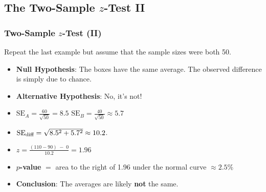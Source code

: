 \documentclass[t]{beamer}
\begin{document}
\subsection{The Two-Sample $z$-Test II}
\begin{frame}
\frametitle{Two-Sample $z$-Test (II)}

{Repeat the last example but assume that the sample sizes were both 50.

\begin{itemize}
\item \textbf{\color{blue}Null Hypothesis}:  The boxes have the same average.  
   The observed difference is simply due to chance.
\item \textbf{\color{blue}Alternative Hypothesis}: No, it's not!\vspace{3pt}
\item $\mbox{SE}_{A} = \frac{60}{\sqrt{50}}=8.5$ \hspace{.5in}
   $\mbox{SE}_{B} = \frac{40}{\sqrt{50}}\approx 5.7$\vspace{3pt}
\item $\mbox{SE}_{\mbox{\scriptsize diff}} = \sqrt{8.5^2 + 5.7^2}\approx 10.2$.\vspace{3pt}
\item $\displaystyle z=
    \frac{(110 - 90)\; -\; 0}{10.2} = 1.96$\vspace{3pt}
\item \textbf{\color{blue}$p$-value} $=$ area to the right of 1.96 under the normal curve $\approx 2.5\%$
\vspace{3pt}
\item \textbf{\color{blue}Conclusion}:  The averages are  likely \textbf{not} the same.
\end{itemize}
}
\end{frame}
\end{document}
